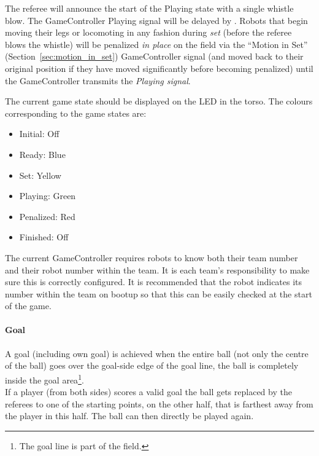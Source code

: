 The referee will announce the start of the Playing state with a single whistle blow.
The GameController Playing signal will be delayed by \PlayingDelayTime.
Robots that begin moving their legs or locomoting in any fashion during \emph{set} (\ie before the referee blows the whistle) will be penalized \textit{in place} on the field via the ``Motion in Set'' (\cf Section~\ref{sec:motion_in_set}) GameController signal (and moved back to their original position if they have moved significantly before becoming penalized) until the GameController transmits the \emph{Playing signal}.

The current game state should be displayed on the LED in the torso. The colours corresponding to the game states are:

\begin{itemize}
	
	\item Initial: Off
	
	\item Ready: Blue
	
	\item Set: Yellow
	
	\item Playing: Green
	
	\item Penalized: Red
	
	\item Finished: Off
	
\end{itemize}

The current GameController requires robots to know both their team number and their robot number within the team. It is each team's responsibility to make sure this is correctly configured. It is recommended that the robot indicates its number within the team on bootup so that this can be easily checked at the start of the game.

\paragraph{Goal}
\label{sec:goal}
A goal (including own goal) is achieved when the entire ball (not only the centre of the ball) goes over the goal-side edge of the goal line, \ie the ball is completely inside the goal area\footnote{The goal line is part of the field.}. \\
If a player (from both sides) scores a valid goal the ball gets replaced by the referees to one of the starting points, on the other half, that is farthest away from the player in this half. The ball can then directly be played again. 

